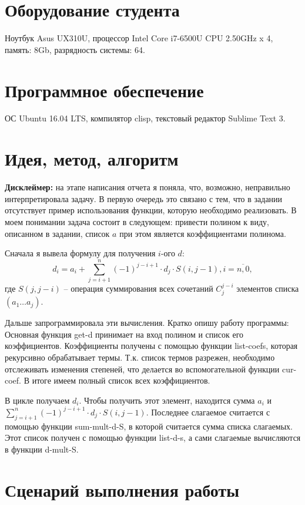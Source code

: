 \documentclass[12pt]{article}
\begin{document}
\section{Оборудование студента}
Ноутбук Asus UX310U, процессор Intel Core i7-6500U CPU 2.50GHz x 4, память: 8Gb, разрядность системы: 64.

\section{Программное обеспечение}
ОС Ubuntu 16.04 LTS, компилятор clisp, текстовый редактор Sublime Text 3.

\section{Идея, метод, алгоритм}
\textbf{Дисклеймер:} на этапе написания отчета я поняла, что, возможно, неправильно интерпретировала задачу. В первую очередь это связано с тем, что в задании отсутствует пример использования функции, которую необходимо реализовать. В моем понимании задача состоит в следующем: привести полином к виду, описанном в задании, список $a$ при этом является коэффициентами полинома.

Сначала я вывела формулу для получения $i$-ого $d$:
$$ d_{i} = a_{i} + \sum_{j=i+1}^n (-1)^{j - i + 1} \cdot d_{j}\cdot S(i, j - 1), i = \overline{n,0},$$
где $S(j, j - i)$ -- операция суммирования всех сочетаний $C_{j}^{j - i}$ элементов списка $(a_{1} \ldots a_{j})$.

Дальше запрограммировала эти вычисления. Кратко опишу работу программы:\\
Основная функция get-d принимает на вход полином и список его коэффициентов. Коэффициенты получены с помощью функции list-coefs, которая рекурсивно обрабатывает термы. Т.к. список термов разрежен, необходимо отслеживать изменения степеней, что делается во вспомогательной функции cur-coef. В итоге имеем полный список всех коэффициентов.\par
В цикле получаем $d_{i}$. Чтобы получить этот элемент, находится сумма $a_{i}$ и $\sum_{j=i+1}^n (-1)^{j - i + 1} \cdot d_{j}\cdot S(i, j - 1)$. Последнее слагаемое считается с помощью функции sum-mult-d-S, в которой считается сумма списка слагаемых. Этот список получен с помощью функции list-d-s, а сами слагаемые вычисляются в функции d-mult-S. 

\section{Сценарий выполнения работы}
\end{document}
